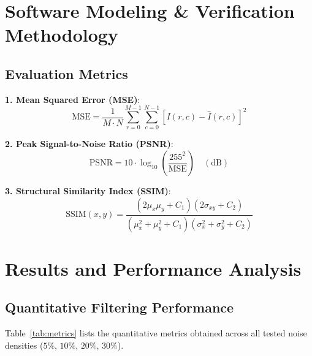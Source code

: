 \documentclass[12pt,a4paper]{article}
\begin{document}
\section{Software Modeling \& Verification Methodology}

\subsection{Evaluation Metrics}
\textbf{1. Mean Squared Error (MSE)}:
\begin{equation}
\text{MSE} = \frac{1}{M \cdot N}\sum_{r=0}^{M-1}\sum_{c=0}^{N-1}[I(r,c) - \hat{I}(r,c)]^2
\end{equation}

\textbf{2. Peak Signal-to-Noise Ratio (PSNR)}:
\begin{equation}
\text{PSNR} = 10 \cdot \log_{10}\left(\frac{255^2}{\text{MSE}}\right) \quad (\text{dB})
\end{equation}

\textbf{3. Structural Similarity Index (SSIM)}:
\begin{equation}
\text{SSIM}(x,y) = \frac{(2\mu_x\mu_y + C_1)(2\sigma_{xy} + C_2)}{(\mu_x^2 + \mu_y^2 + C_1)(\sigma_x^2 + \sigma_y^2 + C_2)}
\end{equation}

\section{Results and Performance Analysis}

\subsection{Quantitative Filtering Performance}
Table~\ref{tab:metrics} lists the quantitative metrics obtained across all tested noise densities ($5\%$, $10\%$, $20\%$, $30\%$).
\end{document}
